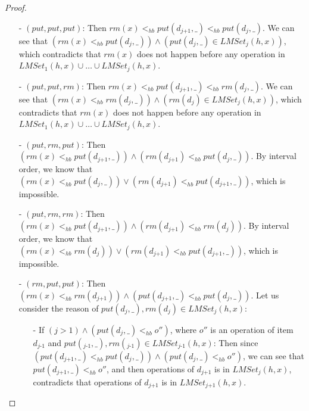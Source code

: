 \documentclass{llncs}
\begin{document}
\begin {proof}
\begin{itemize}
\setlength{\itemsep}{0.5pt}
\item[-] $(\textit{put},\textit{put},\textit{put})$: Then $\textit{rm}(x) <_{hb} \textit{put}(d_{\textit{j+1}},\_) <_{hb} \textit{put}(d_j,\_)$. We can see that $( \textit{rm}(x) <_{hb} \textit{put}(d_j,\_) ) \wedge ( \textit{put}(d_j,\_) \in \textit{LMSet}_j(h,x) )$, which contradicts that $\textit{rm}(x)$ does not happen before any operation in $\textit{LMSet}_1(h,x) \cup \ldots \cup \textit{LMSet}_j(h,x)$.

\item[-] $(\textit{put},\textit{put},\textit{rm})$: Then $\textit{rm}(x) <_{hb} \textit{put}(d_{\textit{j+1}},\_) <_{hb} \textit{rm}(d_j,\_)$. We can see that $( \textit{rm}(x) <_{hb} \textit{rm}(d_j,\_) ) \wedge ( \textit{rm}(d_j) \in \textit{LMSet}_j(h,x) )$, which contradicts that $\textit{rm}(x)$ does not happen before any operation in $\textit{LMSet}_1(h,x) \cup \ldots \cup \textit{LMSet}_j(h,x)$.

\item[-] $(\textit{put},\textit{rm},\textit{put})$: Then $( \textit{rm}(x) <_{hb} \textit{put}(d_{\textit{j+1}},\_) ) \wedge ( \textit{rm}(d_{\textit{j+1}}) <_{hb} \textit{put}(d_j,\_) )$. By interval order, we know that $( \textit{rm}(x) <_{hb} \textit{put}(d_j,\_) ) \vee ( \textit{rm}(d_{\textit{j+1}}) <_{hb} \textit{put}(d_{\textit{j+1}},\_) )$, which is impossible.

\item[-] $(\textit{put},\textit{rm},\textit{rm})$: Then $( \textit{rm}(x) <_{hb} \textit{put}(d_{\textit{j+1}},\_) ) \wedge ( \textit{rm}(d_{\textit{j+1}}) <_{hb} \textit{rm}(d_j) )$. By interval order, we know that $( \textit{rm}(x) <_{hb} \textit{rm}(d_j) ) \vee ( \textit{rm}(d_{\textit{j+1}}) <_{hb} \textit{put}(d_{\textit{j+1}},\_) )$, which is impossible.

\item[-] $(\textit{rm},\textit{put},\textit{put})$: Then $( \textit{rm}(x) <_{hb} \textit{rm}(d_{\textit{j+1}}) ) \wedge ( \textit{put}(d_{\textit{j+1}},\_) <_{hb} \textit{put}(d_j,\_) )$. Let us consider the reason of $\textit{put}(d_j,\_), \textit{rm}(d_j) \in \textit{LMSet}_j(h,x)$:
    \begin{itemize}
    \setlength{\itemsep}{0.5pt}
    \item[-] If $( j > 1 ) \wedge ( \textit{put}(d_j,\_) <_{hb} o'' )$, where $o''$ is an operation of item $d_{\textit{j-1}}$ and $\textit{put}(_{\textit{j-1}},\_), \textit{rm}(_{\textit{j-1}}) \in \textit{LMSet}_{\textit{j-1}}(h,x)$: Then since $( \textit{put}(d_{\textit{j+1}},\_) <_{hb} \textit{put}(d_j,\_) ) \wedge ( \textit{put}(d_j,\_) <_{hb} o'' )$, we can see that $\textit{put}(d_{\textit{j+1}},\_) <_{hb} o''$, and then operations of $d_{\textit{j+1}}$ is in $\textit{LMSet}_j(h,x)$, contradicts that operations of $d_{\textit{j+1}}$ is in $\textit{LMSet}_{\textit{j+1}}(h,x)$.


\end{itemize}
\end{itemize}
\end{proof}
\end{document}
